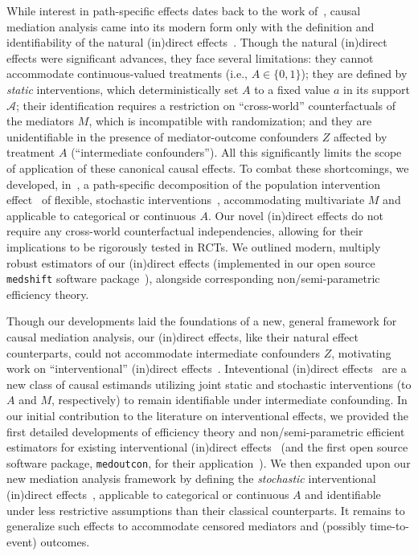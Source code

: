 While interest in path-specific effects dates back to the work
of~\citet{wright1934method}, causal mediation analysis came into its modern form
only with the definition and identifiability of the natural (in)direct
effects~\citep{robins1992identifiability, pearl2001direct}. Though the natural
(in)direct effects were significant advances, they face several limitations:
they cannot accommodate continuous-valued treatments (i.e., $A \in \{0, 1\}$);
they are defined by \textit{static} interventions, which
deterministically set $A$ to a fixed value $a$ in its support $\mathcal{A}$;
their identification requires a restriction on ``cross-world'' counterfactuals
of the mediators $M$, which is incompatible with randomization; and they are
unidentifiable in the presence of mediator-outcome confounders $Z$ affected by
treatment $A$ (``intermediate confounders''). All this significantly limits the
scope of application of these canonical causal effects. To combat these
shortcomings, we developed, in~\citet{diaz2020causal}, a path-specific
decomposition of the population intervention effect~\citep{diaz2012population}
of flexible, stochastic interventions~\citep{stock1989nonparametric,
diaz2013assessing, kennedy2019nonparametric}, accommodating multivariate $M$ and
applicable to categorical or continuous $A$. Our novel (in)direct effects do not
require any cross-world counterfactual independencies, allowing for their
implications to be rigorously tested in RCTs. We outlined modern, multiply
robust estimators of our (in)direct effects (implemented in our open source
\texttt{medshift} software package~\citep{hejazi-gh-medshift}), alongside
corresponding non/semi-parametric efficiency theory.

Though our developments laid the foundations of a new, general framework for
causal mediation analysis, our (in)direct effects, like their natural effect
counterparts, could not accommodate intermediate confounders $Z$, motivating
work on ``interventional'' (in)direct effects~\citep{diaz2020nonparametric,
hejazi2020nonparametric}. Inteventional (in)direct
effects~\citep{vanderweele2014effect, vansteelandt2017interventional} are a new
class of causal estimands utilizing joint static and stochastic interventions
(to $A$ and $M$, respectively) to remain identifiable under intermediate
confounding. In our initial contribution to the literature on interventional
effects, we provided the first detailed developments of efficiency theory and
non/semi-parametric efficient estimators for existing interventional (in)direct
effects~\citep{diaz2020nonparametric} (and the first open source software
package, \texttt{medoutcon}, for their application~\citep{hejazi-gh-medoutcon}).
We then expanded upon our new mediation analysis framework by defining the
\textit{stochastic} interventional (in)direct
effects~\citep{hejazi2020nonparametric}, applicable to categorical or continuous
$A$ and identifiable under less restrictive assumptions than their classical
counterparts.
It remains to generalize such effects to accommodate censored mediators and
(possibly time-to-event) outcomes.

